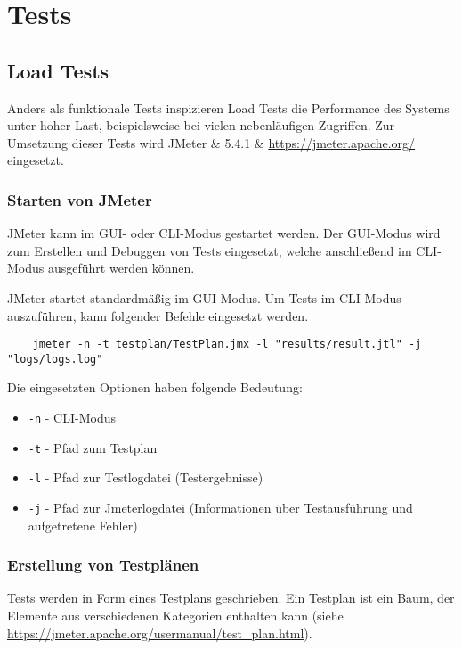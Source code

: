 \chapter{Tests}

\section{Load Tests}

Anders als funktionale Tests inspizieren Load Tests die Performance des Systems unter hoher Last,
beispielsweise bei vielen nebenläufigen Zugriffen.
Zur Umsetzung dieser Tests wird JMeter & 5.4.1 & \url{https://jmeter.apache.org/} eingesetzt.

\subsection{Starten von JMeter}

JMeter kann im GUI- oder CLI-Modus gestartet werden.
Der GUI-Modus wird zum Erstellen und Debuggen von Tests eingesetzt,
welche anschließend im CLI-Modus ausgeführt werden können.

JMeter startet standardmäßig im GUI-Modus.
Um Tests im CLI-Modus auszuführen, kann folgender Befehle eingesetzt werden.

\begin{lstlisting}
    jmeter -n -t testplan/TestPlan.jmx -l "results/result.jtl" -j "logs/logs.log"
\end{lstlisting}

Die eingesetzten Optionen haben folgende Bedeutung:

\begin{itemize}
    \item \texttt{-n} - CLI-Modus
    \item \texttt{-t} - Pfad zum Testplan
    \item \texttt{-l} - Pfad zur Testlogdatei (Testergebnisse)
    \item \texttt{-j} - Pfad zur Jmeterlogdatei (Informationen über Testausführung und aufgetretene Fehler)
\end{itemize}

\subsection{Erstellung von Testplänen}

Tests werden in Form eines Testplans geschrieben.
Ein Testplan ist ein Baum, der Elemente aus verschiedenen Kategorien enthalten kann (siehe \url{https://jmeter.apache.org/usermanual/test_plan.html}).

